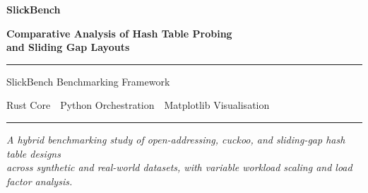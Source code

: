 \documentclass[11pt,a4paper]{article}
\begin{document}
\begin{titlepage}
  \centering
  \vspace*{2cm}
  {\Huge\bfseries\color{accentblue} SlickBench\par}
  \vspace{0.4cm}
  {\large\bfseries Comparative Analysis of Hash Table Probing\\and Sliding Gap Layouts\par}
  \vspace{1.5cm}
  \rule{\linewidth}{0.5pt}
  \vspace{0.5cm}
  {\normalsize SlickBench Benchmarking Framework\par}
  {\normalsize Rust Core~\textbar~Python Orchestration~\textbar~Matplotlib Visualisation\par}
  \vspace{0.5cm}
  \rule{\linewidth}{0.5pt}
  \vfill
  {\small\itshape A hybrid benchmarking study of open-addressing, cuckoo, and sliding-gap hash table designs\\across synthetic and real-world datasets, with variable workload scaling and load factor analysis.\par}
  \vspace{2cm}
\end{titlepage}

\tableofcontents
\newpage

\begin{abstract}
This report presents a comprehensive benchmarking study of diverse hash table implementations, ranging from traditional open-addressing schemes (Linear and Quadratic Probing) to more complex structures like Cuckoo Hashing and Slick Hashing. We evaluate these structures across various synthetic and real-world datasets, measuring both time performance (nanoseconds per operation) and space efficiency (bytes per element). Our findings highlight the significant performance of the standard library implementation while illustrating the trade-offs in memory overhead and probe locality for the specialised Slick Hash structure. This report includes variable workload scaling (10× steps) and load factor growth analysis.
\end{abstract}
\end{document}
